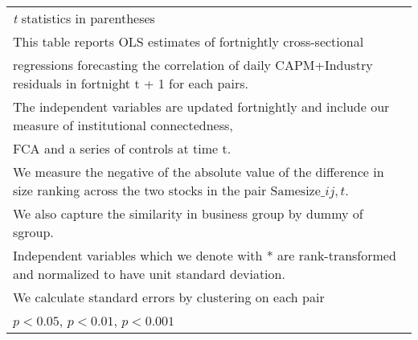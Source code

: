 {\begin{tabular}{l*{7}{c}}
\hline\hline
\multicolumn{8}{l}{\footnotesize \textit{t} statistics in parentheses}\\
\multicolumn{8}{l}{\footnotesize This table reports OLS estimates of fortnightly cross-sectional}\\
\multicolumn{8}{l}{\footnotesize  regressions forecasting the correlation of daily CAPM+Industry residuals in fortnight t + 1 for each pairs.}\\
\multicolumn{8}{l}{\footnotesize The independent variables are updated fortnightly and include our measure of institutional connectedness,}\\
\multicolumn{8}{l}{\footnotesize  FCA and a series of controls at time t.}\\
\multicolumn{8}{l}{\footnotesize We measure the negative of the absolute value of the difference in size ranking across the two stocks in the pair $ \text{Samesize}\_{ij,t} $.}\\
\multicolumn{8}{l}{\footnotesize We also capture the similarity in business group by dummy of sgroup.}\\
\multicolumn{8}{l}{\footnotesize Independent variables which  we denote with * are rank-transformed and normalized to have unit standard deviation.}\\
\multicolumn{8}{l}{\footnotesize  We calculate standard errors by clustering on each pair}\\
\multicolumn{8}{l}{\footnotesize \sym{*} \(p<0.05\), \sym{**} \(p<0.01\), \sym{***} \(p<0.001\)}\\
\end{tabular}
}
